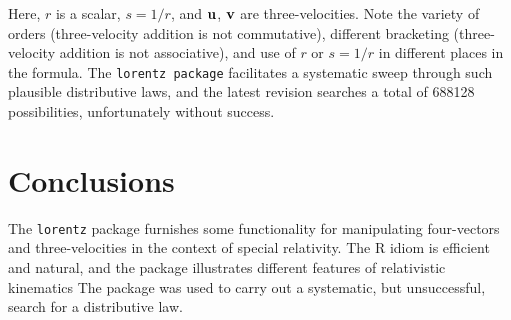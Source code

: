 \documentclass[ijoc,nonblindrev]{informs3} %
\begin{document}
Here, $r$ is a scalar, $s=1/r$, and $\mathbf u$, $\mathbf v$ are three-velocities.
Note the variety of orders (three-velocity addition is not
commutative), different bracketing (three-velocity addition is not
associative), and use of $r$ or $s=1/r$ in different places in the
formula.  The {\tt lorentz package} facilitates a systematic sweep
through such plausible distributive laws, and the latest revision
searches a total of 688128 possibilities, unfortunately without
success.

\section{Conclusions}

The {\tt lorentz} package furnishes some functionality for
manipulating four-vectors and three-velocities in the context of
special relativity.  The R idiom is efficient and natural, and the
package illustrates different features of relativistic kinematics 
The package was used to carry out a systematic, but unsuccessful,
search for a distributive law.


%
%
%




\end{document}
